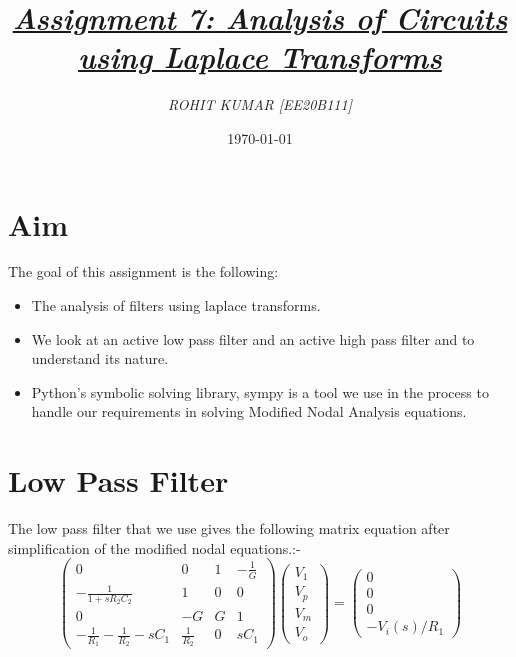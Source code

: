 \documentclass[11pt, a4paper]{article}
\title{\underline{\textit{\Large{Assignment 7: Analysis of Circuits using Laplace Transforms}}}}
\author{\textit{ROHIT KUMAR [EE20B111]}}
\date{\today}
\begin{document}
\maketitle

\section*{Aim}
The goal of this assignment is the following:
\begin{itemize}
\item The analysis of filters using laplace transforms.
\item We look at an active low pass filter and an active high pass filter and to understand its nature.
\item Python’s  symbolic  solving  library,  sympy  is  a  tool  we  use  in  the  process  to handle our requirements in solving Modified Nodal Analysis equations. 

\end{itemize}

\section*{Low Pass Filter}
The low pass filter that we use gives the following matrix equation after simplification of the modified nodal equations.:-
\[\begin{pmatrix} 0 & 0 & 1 & -\frac{1}{G} \\ -\frac{1}{1+sR_2C_2} & 1 & 0 & 0 \\ 0 & -G & G & 1 \\ -\frac{1}{R_1}-\frac{1}{R_2}-sC_1 & \frac{1}{R_2} & 0 & sC_1 \end{pmatrix}\begin{pmatrix} V_1 \\ V_p \\ V_m \\ V_o \end{pmatrix} = \begin{pmatrix} 0 \\ 0 \\ 0 \\ -V_i(s)/R_1 \end{pmatrix}\]
\end{document}
